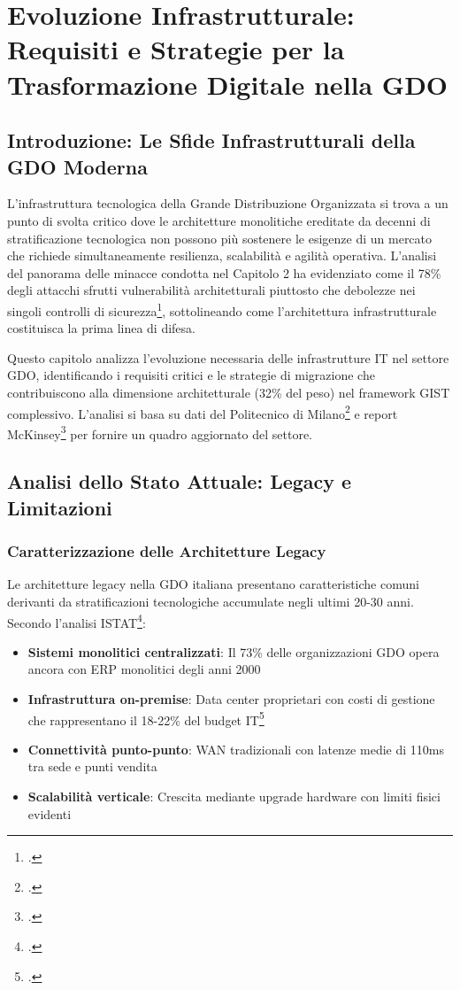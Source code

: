 \chapter{Evoluzione Infrastrutturale: Requisiti e Strategie per la Trasformazione Digitale nella GDO}

\section{Introduzione: Le Sfide Infrastrutturali della GDO Moderna}

L'infrastruttura tecnologica della Grande Distribuzione Organizzata si trova a un punto di svolta critico dove le architetture monolitiche ereditate da decenni di stratificazione tecnologica non possono più sostenere le esigenze di un mercato che richiede simultaneamente resilienza, scalabilità e agilità operativa. L'analisi del panorama delle minacce condotta nel Capitolo 2 ha evidenziato come il 78\% degli attacchi sfrutti vulnerabilità architetturali piuttosto che debolezze nei singoli controlli di sicurezza\footcite{Anderson2024patel}, sottolineando come l'architettura infrastrutturale costituisca la prima linea di difesa.

Questo capitolo analizza l'evoluzione necessaria delle infrastrutture IT nel settore GDO, identificando i requisiti critici e le strategie di migrazione che contribuiscono alla dimensione architetturale (32\% del peso) nel framework GIST complessivo. L'analisi si basa su dati del Politecnico di Milano\footcite{Osservatorio2024} e report McKinsey\footcite{McKinsey2024} per fornire un quadro aggiornato del settore.

\section{Analisi dello Stato Attuale: Legacy e Limitazioni}

\subsection{Caratterizzazione delle Architetture Legacy}

Le architetture legacy nella GDO italiana presentano caratteristiche comuni derivanti da stratificazioni tecnologiche accumulate negli ultimi 20-30 anni. Secondo l'analisi ISTAT\footcite{istat2024}:

\begin{itemize}
\item \textbf{Sistemi monolitici centralizzati}: Il 73\% delle organizzazioni GDO opera ancora con ERP monolitici degli anni 2000
\item \textbf{Infrastruttura on-premise}: Data center proprietari con costi di gestione che rappresentano il 18-22\% del budget IT\footcite{bancaditalia2023}
\item \textbf{Connettività punto-punto}: WAN tradizionali con latenze medie di 110ms tra sede e punti vendita
\item \textbf{Scalabilità verticale}: Crescita mediante upgrade hardware con limiti fisici evidenti
\end{itemize}

